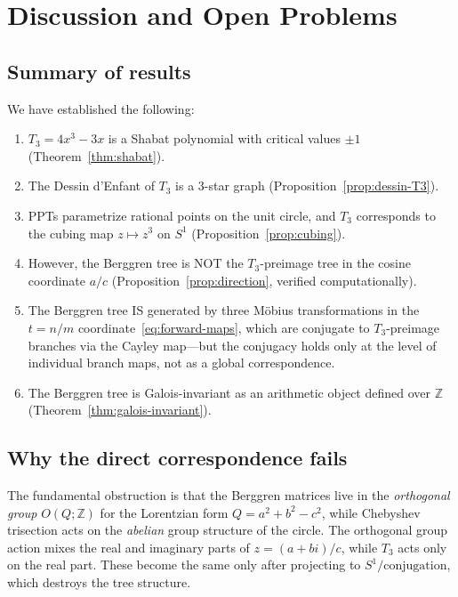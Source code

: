 \documentclass[12pt]{amsart}
\theoremstyle{definition}
\theoremstyle{remark}
\newcommand{\ZZ}{\mathbb{Z}}
\begin{document}
\section{Discussion and Open Problems}\label{sec:discussion}

\subsection{Summary of results}

We have established the following:
\begin{enumerate}
  \item $T_3 = 4x^3-3x$ is a Shabat polynomial with critical values
        $\pm 1$ (Theorem~\ref{thm:shabat}).
  \item The Dessin d'Enfant of $T_3$ is a 3-star graph
        (Proposition~\ref{prop:dessin-T3}).
  \item PPTs parametrize rational points on the unit circle, and $T_3$
        corresponds to the cubing map $z\mapsto z^3$ on $S^1$
        (Proposition~\ref{prop:cubing}).
  \item However, the Berggren tree is NOT the $T_3$-preimage tree in
        the cosine coordinate $a/c$ (Proposition~\ref{prop:direction},
        verified computationally).
  \item The Berggren tree IS generated by three M\"obius transformations
        in the $t=n/m$ coordinate~\eqref{eq:forward-maps}, which are
        conjugate to $T_3$-preimage branches via the Cayley map---but
        the conjugacy holds only at the level of individual branch
        maps, not as a global correspondence.
  \item The Berggren tree is Galois-invariant as an arithmetic object
        defined over $\ZZ$ (Theorem~\ref{thm:galois-invariant}).
\end{enumerate}

\subsection{Why the direct correspondence fails}

The fundamental obstruction is that the Berggren matrices live in the
\emph{orthogonal group} $O(Q;\ZZ)$ for the Lorentzian form
$Q = a^2+b^2-c^2$, while Chebyshev trisection acts on the
\emph{abelian} group structure of the circle.  The orthogonal group
action mixes the real and imaginary parts of $z = (a+bi)/c$, while
$T_3$ acts only on the real part.  These become the same only after
projecting to $S^1/\text{conjugation}$, which destroys the tree
structure.
\end{document}
